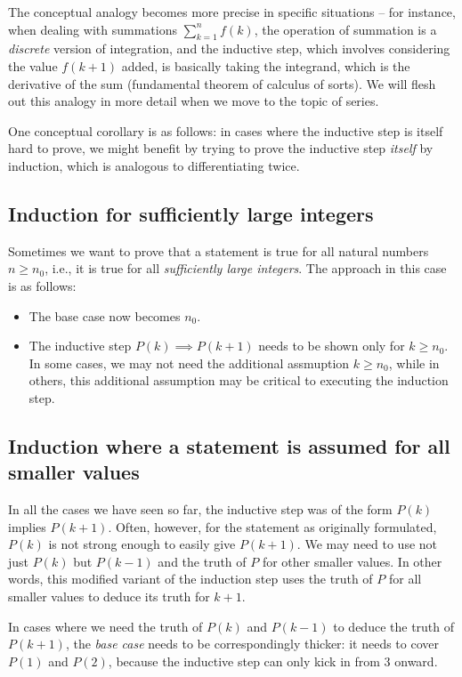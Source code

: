 \documentclass{amsart}
\begin{document}
The conceptual analogy becomes more precise in specific situations --
for instance, when dealing with summations $\sum_{k=1}^n f(k)$, the
operation of summation is a {\em discrete} version of integration, and
the inductive step, which involves considering the value $f(k + 1)$
added, is basically taking the integrand, which is the derivative of
the sum (fundamental theorem of calculus of sorts). We will flesh out
this analogy in more detail when we move to the topic of series.

One conceptual corollary is as follows: in cases where the inductive
step is itself hard to prove, we might benefit by trying to prove the
inductive step {\em itself} by induction, which is analogous to
differentiating twice.

\subsection{Induction for sufficiently large integers}

Sometimes we want to prove that a statement is true for all natural
numbers $n \ge n_0$, i.e., it is true for all {\em sufficiently large
integers}. The approach in this case is as follows:

\begin{itemize}
\item The base case now becomes $n_0$.
\item The inductive step $P(k) \implies P(k+1)$ needs to be shown only
  for $k \ge n_0$. In some cases, we may not need the additional
  assmuption $k \ge n_0$, while in others, this additional assumption
  may be critical to executing the induction step.
\end{itemize}
\subsection{Induction where a statement is assumed for all smaller values}

In all the cases we have seen so far, the inductive step was of the
form $P(k)$ implies $P(k + 1)$. Often, however, for the statement as
originally formulated, $P(k)$ is not strong enough to easily give $P(k
+ 1)$. We may need to use not just $P(k)$ but $P(k - 1)$ and the truth
of $P$ for other smaller values. In other words, this modified variant
of the induction step uses the truth of $P$ for all smaller values to
deduce its truth for $k + 1$.

In cases where we need the truth of $P(k)$ and $P(k-1)$ to deduce the
truth of $P(k + 1)$, the {\em base case} needs to be correspondingly
thicker: it needs to cover $P(1)$ and $P(2)$, because the inductive
step can only kick in from $3$ onward.
\end{document}
